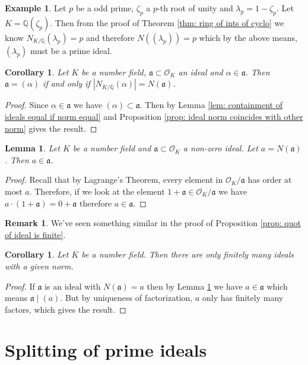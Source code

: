 \documentclass[11pt,a4paper]{report}
\theoremstyle{plain}
\newtheorem{lem}[subsection]{Lemma}
\newtheorem{cor}[subsection]{Corollary}
\theoremstyle{definition}
\newtheorem{exmp}[subsection]{Example}
\theoremstyle{definition}
\newtheorem{rmrk}[subsection]{Remark}
\def\QQ{\mathbb{Q}}
\def \a{\alpha}
\def \lam {\lambda}
\def \OO {\mathcal{O}}
\def\gotha{\mathfrak{a}}
\begin{document}
\begin{exmp}
Let $p$ be a odd prime, $\zeta_p$ a $p$-th root of unity and $\lam_p=1-\zeta_p$. Let $K=\QQ(\zeta_p)$. Then  from the proof of Theorem \ref{thm: ring of ints of cyclo} we know $N_{K/\QQ}(\lam_p)=p$ and therefore  $N((\lam_p))=p$ which by the above means, $(\lam_p)$ must be a prime ideal.
\end{exmp}

\begin{cor}
Let $K$ be a number field, $\gotha \subset \OO_K$ an ideal and $\a \in \gotha$. Then $\gotha=(\a)$ if and only if $|N_{K/\QQ}(\a)|=N(\gotha)$.
\end{cor}

\begin{proof}
Since $\a \in \gotha$ we have $(\a) \subset \gotha$. Then by Lemma \ref{lem: containment of ideals equal if norm equal} and Proposition \ref{prop: ideal norm coincides with other norm} gives the result.
\end{proof}

\begin{lem}\label{lem: ideal contains its norm}
Let $K$ be a number field and $\gotha \subset \OO_K$ a non-zero ideal. Let $a=N(\gotha)$. Then $a \in \gotha$.
\end{lem}
\begin{proof}
Recall that by Lagrange's Theorem, every element in $\OO_K/\gotha$ has order at most $a$. Therefore, if we look at the element $1+\gotha \in \OO_K/\gotha$ we have $a\cdot (1+\gotha)=0 +\gotha$ therefore $a \in \gotha$. 
\end{proof}

\begin{rmrk}
We've seen something similar in the proof of Proposition \ref{prop: quot of ideal is finite}.
\end{rmrk}


\begin{cor}\label{cor: fin many ideals of given norm}
Let $K$ be a number field. Then there are only finitely many ideals with a given norm.
\end{cor}
\begin{proof}
If $\gotha$ is an ideal with $N(\gotha)=a$ then by Lemma \ref{lem: ideal contains its norm} we have $a \in \gotha$ which means $\gotha \mid (a)$. But by uniqueness of factorization, $a$ only has finitely many factors, which gives the result.
\end{proof}


\section{Splitting of prime ideals}
\end{document}

